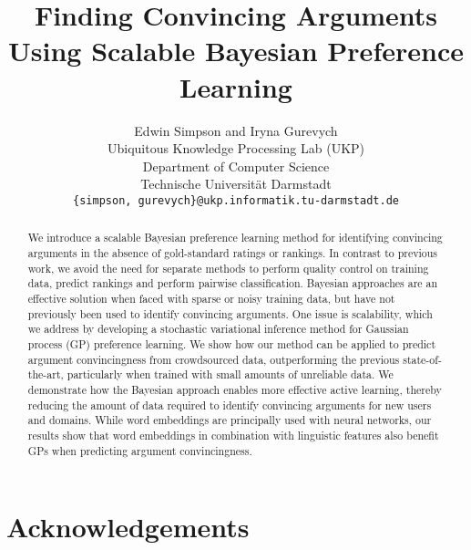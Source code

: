 \documentclass[11pt,letterpaper]{article}
\title{ 
Finding Convincing Arguments Using Scalable Bayesian Preference Learning
}
\author{Edwin Simpson and Iryna Gurevych\\
  Ubiquitous Knowledge Processing Lab (UKP)\\
  Department of Computer Science \\
  Technische Universit{\"a}t Darmstadt  \\
  {\tt \{simpson, gurevych\}@ukp.informatik.tu-darmstadt.de} \\}
\begin{document}
\maketitle
\begin{abstract}
We introduce a scalable Bayesian preference learning method for identifying
convincing arguments in the absence of gold-standard ratings or rankings.
In contrast to previous work, we avoid the need for separate methods
to perform quality control on training data, predict rankings and perform pairwise classification.
Bayesian approaches are an effective solution when faced with sparse or noisy training data, 
but have not previously been used to identify convincing arguments.
One issue is scalability, which we address by developing a 
stochastic variational inference method for Gaussian process (GP) preference learning.
We show how our method can be applied to predict argument convincingness from crowdsourced data, 
outperforming the previous state-of-the-art, particularly when trained with small amounts of unreliable data.  
We demonstrate how the Bayesian approach enables more effective active learning,
thereby reducing the amount of data required to identify convincing arguments for new users and domains.
While word embeddings are principally used with neural networks, our results show that word embeddings in combination with linguistic features also benefit GPs when predicting argument convincingness.
\end{abstract}

%








\section*{Acknowledgements}
\end{document}
